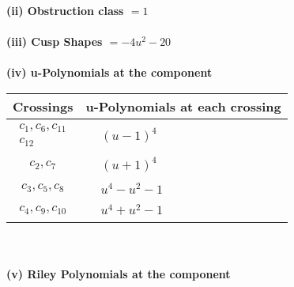 \documentclass[1p]{elsarticle_modified}
\theoremstyle{definition}
\begin{document}
\flushleft \textbf{(ii) Obstruction class $= 1$}\\~\\
\flushleft \textbf{(iii) Cusp Shapes $= -4 u^2-20$}\\~\\
\newpage\renewcommand{\arraystretch}{1}
\flushleft \textbf{(iv) u-Polynomials at the component}\newline \\
\begin{tabular}{m{50pt}|m{274pt}}
Crossings & \hspace{64pt}u-Polynomials at each crossing \\
\hline $$\begin{aligned}c_{1},c_{6},c_{11}\\c_{12}\end{aligned}$$&$\begin{aligned}
&(u-1)^4
\end{aligned}$\\
\hline $$\begin{aligned}c_{2},c_{7}\end{aligned}$$&$\begin{aligned}
&(u+1)^4
\end{aligned}$\\
\hline $$\begin{aligned}c_{3},c_{5},c_{8}\end{aligned}$$&$\begin{aligned}
&u^4- u^2-1
\end{aligned}$\\
\hline $$\begin{aligned}c_{4},c_{9},c_{10}\end{aligned}$$&$\begin{aligned}
&u^4+u^2-1
\end{aligned}$\\
\hline
\end{tabular}\\~\\
\newpage\renewcommand{\arraystretch}{1}
\flushleft \textbf{(v) Riley Polynomials at the component}\newline \\
\end{document}
